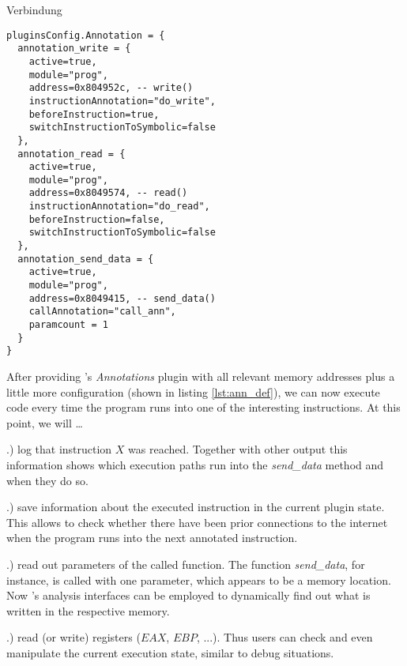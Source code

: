 Verbindung

\bigskip
\begin{lstlisting}[language={[5.0]Lua}, basicstyle=\ttfamily\footnotesize, caption={Configuration of the \textit{Annotations} plugin (part). Defines the instructions to be monitored and actions to trigger upon execution of these instructions. Note the link to the binary in listing \ref{lst:ass} via memory addresses.}, label={lst:ann_def}]
pluginsConfig.Annotation = {
  annotation_write = {
    active=true,
    module="prog",
    address=0x804952c, -- write()
    instructionAnnotation="do_write",
    beforeInstruction=true,
    switchInstructionToSymbolic=false
  },
  annotation_read = {
    active=true,
    module="prog",
    address=0x8049574, -- read()
    instructionAnnotation="do_read",
    beforeInstruction=false, 
    switchInstructionToSymbolic=false
  },
  annotation_send_data = {
    active=true,
    module="prog",
    address=0x8049415, -- send_data()
    callAnnotation="call_ann",
    paramcount = 1
  }
}
\end{lstlisting}
\bigskip


After providing \sse's \textit{Annotations} plugin with all relevant memory addresses plus a little more configuration (shown in listing \ref{lst:ann_def}), we can now execute code every time the program runs into one of the interesting instructions.
At this point, we will \ldots

.) log that instruction $X$ was reached.
Together with other \sse output this information shows which execution paths run into the \textit{send\_data} method and when they do so.

.) save information about the executed instruction in the current plugin state.
This allows to check whether there have been prior connections to the internet when the program runs into the next annotated instruction.

.) read out parameters of the called function.
The function \textit{send\_data}, for instance, is called with one parameter, which appears to be a memory location.
Now \sse's analysis interfaces can be employed to dynamically find out what is written in the respective memory.

.) read (or write) registers ($EAX$, $EBP$, ...).
Thus \sse users can check and even manipulate the current execution state, similar to debug situations.

